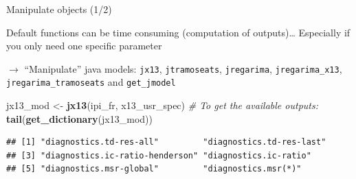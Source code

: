 \documentclass[10pt,xcolor=table,color={dvipsnames,usenames},ignorenonframetext,usepdftitle=false,french]{beamer}
\newenvironment{Shaded}{\begin{snugshade}}{\end{snugshade}}
\newcommand{\CommentTok}[1]{\textcolor[rgb]{0.56,0.35,0.01}{\textit{#1}}}
\newcommand{\KeywordTok}[1]{\textcolor[rgb]{0.13,0.29,0.53}{\textbf{#1}}}
\newcommand{\NormalTok}[1]{#1}
\newcommand{\StringTok}[1]{\textcolor[rgb]{0.31,0.60,0.02}{#1}}
\begin{document}
\begin{frame}[fragile]{Manipulate \faJava{} objects (1/2)}
\protect\hypertarget{manipulate-objects-12}{}

\footnotesize

Default functions can be time consuming (computation of outputs)\ldots{}
Especially if you only need one specific parameter

\medskip

\(\rightarrow\) ``Manipulate'' java models: \texttt{jx13},
\texttt{jtramoseats}, \texttt{jregarima}, \texttt{jregarima\_x13},
\texttt{jregarima\_tramoseats} and \texttt{get\_jmodel}

\medskip

\begin{Shaded}
\begin{Highlighting}[]
\NormalTok{jx13_mod <-}\StringTok{ }\KeywordTok{jx13}\NormalTok{(ipi_fr, x13_usr_spec)}
\CommentTok{# To get the available outputs:}
\KeywordTok{tail}\NormalTok{(}\KeywordTok{get_dictionary}\NormalTok{(jx13_mod))}
\end{Highlighting}
\end{Shaded}

\begin{verbatim}
## [1] "diagnostics.td-res-all"         "diagnostics.td-res-last"       
## [3] "diagnostics.ic-ratio-henderson" "diagnostics.ic-ratio"          
## [5] "diagnostics.msr-global"         "diagnostics.msr(*)"
\end{verbatim}

\end{frame}
\end{document}
